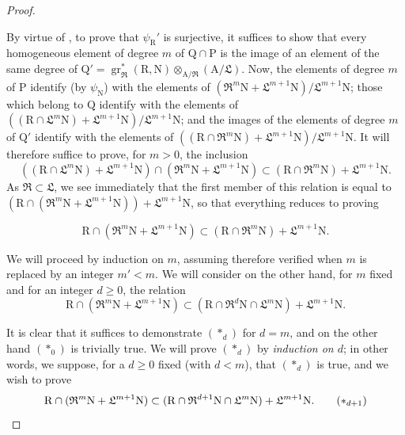 \begin{proof}
\begin{env}[19.7.1.5]
\label{IV.19.7.1.5}
By virtue of , to prove that $\psi_\mathrm{R}'$ is surjective, it suffices to show that every homogeneous element of degree $m$ of $\mathrm{Q}\cap\mathrm{P}$ is the image of an element of the same degree of $\mathrm{Q}'=\operatorname{gr}_\mathfrak{R}^*(\mathrm{R},\mathrm{N})\otimes_{\mathrm{A}/\mathfrak{R}}(\mathrm{A}/\mathfrak{L})$. Now, the elements of degree $m$ of $\mathrm{P}$ identify (by $\psi_\mathrm{N}$) with the elements of $(\mathfrak{R}^m\mathrm{N}+\mathfrak{L}^{m+1}\mathrm{N})/\mathfrak{L}^{m+1}\mathrm{N}$; those which belong to $\mathrm{Q}$ identify with the elements of $((\mathrm{R}\cap\mathfrak{L}^m\mathrm{N})+\mathfrak{L}^{m+1}\mathrm{N})/\mathfrak{L}^{m+1}\mathrm{N}$; and the images of the elements of degree $m$ of $\mathrm{Q}'$ identify with the elements of $((\mathrm{R}\cap\mathfrak{R}^m\mathrm{N})+\mathfrak{L}^{m+1}\mathrm{N})/\mathfrak{L}^{m+1}\mathrm{N}$. It will therefore suffice to prove, for $m>0$, the inclusion
\[
  ((\mathrm{R}\cap\mathfrak{L}^m\mathrm{N})+\mathfrak{L}^{m+1}\mathrm{N})\cap(\mathfrak{R}^m\mathrm{N}+\mathfrak{L}^{m+1}\mathrm{N})\subset(\mathrm{R}\cap\mathfrak{R}^m\mathrm{N})+\mathfrak{L}^{m+1}\mathrm{N}.
\]
As $\mathfrak{R}\subset\mathfrak{L}$, we see immediately that the first member of this relation is equal to $(\mathrm{R}\cap(\mathfrak{R}^m\mathrm{N}+\mathfrak{L}^{m+1}\mathrm{N}))+\mathfrak{L}^{m+1}\mathrm{N}$, so that everything reduces to proving
\end{env}
\begin{env}[19.7.1.6]
\label{IV.19.7.1.6}
\[
  \mathrm{R}\cap(\mathfrak{R}^m\mathrm{N}+\mathfrak{L}^{m+1}\mathrm{N})\subset(\mathrm{R}\cap\mathfrak{R}^m\mathrm{N})+\mathfrak{L}^{m+1}\mathrm{N}.
\]
\end{env}

We will proceed by induction on $m$, assuming therefore  verified when $m$ is replaced by an integer $m'<m$. We will consider on the other hand, for $m$ fixed and for an integer $d\geqslant 0$, the relation
\begin{equation}
  \mathrm{R}\cap(\mathfrak{R}^m\mathrm{N}+\mathfrak{L}^{m+1}\mathrm{N})\subset(\mathrm{R}\cap\mathfrak{R}^d\mathrm{N}\cap\mathfrak{L}^m\mathrm{N})+\mathfrak{L}^{m+1}\mathrm{N}.
  \tag{$*_d$}
\end{equation}

It is clear that it suffices to demonstrate $(*_d)$ for $d=m$, and on the other hand $(*_0)$ is trivially true. We will prove $(*_d)$ by \emph{induction on $d$}; in other words, we suppose, for a $d\geqslant 0$ fixed (with $d<m$), that $(*_d)$ is true, and we wish to prove
\begin{equation}
  \mathrm{R}\cap(\mathfrak{R}^m\mathrm{N}+\mathfrak{L}^{m+1}\mathrm{N})\subset(\mathrm{R}\cap\mathfrak{R}^{d+1}\mathrm{N}\cap\mathfrak{L}^m\mathrm{N})+\mathfrak{L}^{m+1}\mathrm{N}.
  \tag{$*_{d+1}$}
\end{equation}


\end{proof}
